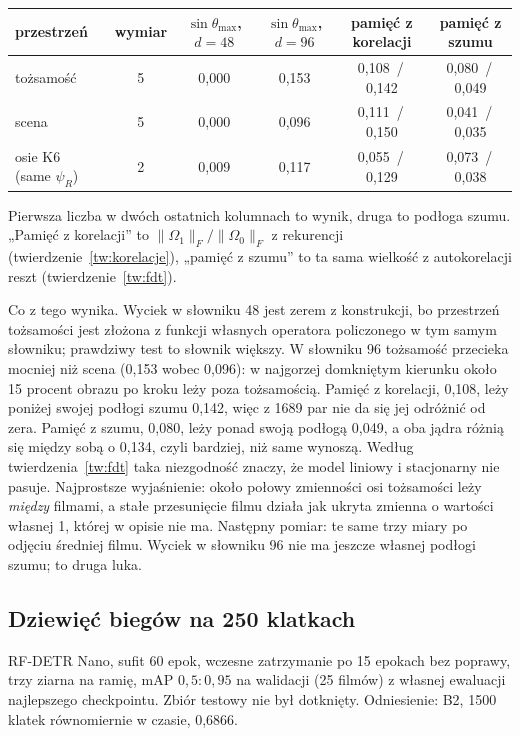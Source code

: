 \documentclass[11pt,a4paper]{article}
\theoremstyle{definition}
\theoremstyle{remark}
\newcommand{\norm}[1]{\lVert #1\rVert}
\begin{document}
\begin{center}\small
\begin{tabular}{@{}lccccc@{}}
\toprule
przestrzeń & wymiar & $\sin\theta_{\max}$, $d=48$ & $\sin\theta_{\max}$, $d=96$ & pamięć z korelacji & pamięć z szumu\\
\midrule
tożsamość & 5 & 0,000 & 0,153 & 0,108 \,/\, 0,142 & 0,080 \,/\, 0,049\\
scena & 5 & 0,000 & 0,096 & 0,111 \,/\, 0,150 & 0,041 \,/\, 0,035\\
osie K6 (same $\psi_R$) & 2 & 0,009 & 0,117 & 0,055 \,/\, 0,129 & 0,073 \,/\, 0,038\\
\bottomrule
\end{tabular}
\end{center}
\noindent Pierwsza liczba w dwóch ostatnich kolumnach to wynik, druga to podłoga szumu. „Pamięć z korelacji”
to $\norm{\Omega_1}_F/\norm{\Omega_0}_F$ z rekurencji (twierdzenie~\ref{tw:korelacje}), „pamięć z szumu” to
ta sama wielkość z autokorelacji reszt (twierdzenie~\ref{tw:fdt}).

Co z tego wynika. Wyciek w słowniku 48 jest zerem z konstrukcji, bo przestrzeń tożsamości jest złożona
z funkcji własnych operatora policzonego w tym samym słowniku; prawdziwy test to słownik większy.
W słowniku 96 tożsamość przecieka mocniej niż scena (0,153 wobec 0,096): w najgorzej domkniętym
kierunku około 15 procent obrazu po kroku leży poza tożsamością. Pamięć z korelacji, 0,108, leży poniżej swojej podłogi szumu 0,142, więc z 1689 par
nie da się jej odróżnić od zera. Pamięć z szumu, 0,080, leży ponad swoją podłogą 0,049, a oba jądra różnią się
między sobą o 0,134, czyli bardziej, niż same wynoszą. Według twierdzenia~\ref{tw:fdt} taka niezgodność znaczy,
że model liniowy i stacjonarny nie pasuje. Najprostsze wyjaśnienie: około połowy zmienności osi tożsamości
leży \emph{między} filmami, a stałe przesunięcie filmu działa jak ukryta zmienna o wartości własnej 1, której
w opisie nie ma. Następny pomiar: te same trzy miary po odjęciu średniej filmu. Wyciek w słowniku 96 nie ma
jeszcze własnej podłogi szumu; to druga luka.

\subsection*{Dziewięć biegów na 250 klatkach}
RF-DETR Nano, sufit 60 epok, wczesne zatrzymanie po 15 epokach bez poprawy, trzy ziarna na ramię, mAP
$0{,}5{:}0{,}95$ na walidacji (25 filmów) z własnej ewaluacji najlepszego checkpointu. Zbiór testowy nie był
dotknięty. Odniesienie: B2, 1500 klatek równomiernie w czasie, 0,6866.
\end{document}
